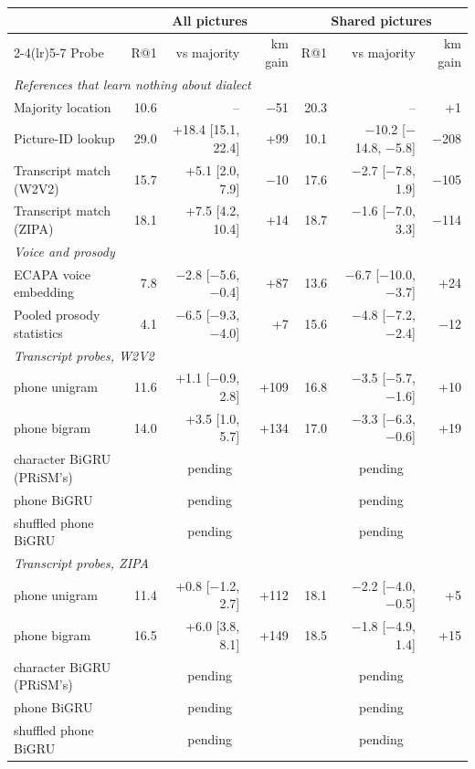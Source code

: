\begin{tabular}{lrrrrrr}
\toprule
 & \multicolumn{3}{c}{All pictures} & \multicolumn{3}{c}{Shared pictures} \\
\cmidrule(lr){2-4}\cmidrule(lr){5-7}
Probe & R@1 & vs majority & km gain & R@1 & vs majority & km gain \\
\midrule
\multicolumn{7}{l}{\textit{References that learn nothing about dialect}} \\
\quad Majority location & 10.6 & -- & $-$51 & 20.3 & -- & +1 \\
\quad Picture-ID lookup & 29.0 & +18.4 [15.1, 22.4] & +99 & 10.1 & $-$10.2 [$-$14.8, $-$5.8] & $-$208 \\
\quad Transcript match (W2V2) & 15.7 & +5.1 [2.0, 7.9] & $-$10 & 17.6 & $-$2.7 [$-$7.8, 1.9] & $-$105 \\
\quad Transcript match (ZIPA) & 18.1 & +7.5 [4.2, 10.4] & +14 & 18.7 & $-$1.6 [$-$7.0, 3.3] & $-$114 \\
\midrule
\multicolumn{7}{l}{\textit{Voice and prosody}} \\
\quad ECAPA voice embedding & 7.8 & $-$2.8 [$-$5.6, $-$0.4] & +87 & 13.6 & $-$6.7 [$-$10.0, $-$3.7] & +24 \\
\quad Pooled prosody statistics & 4.1 & $-$6.5 [$-$9.3, $-$4.0] & +7 & 15.6 & $-$4.8 [$-$7.2, $-$2.4] & $-$12 \\
\midrule
\multicolumn{7}{l}{\textit{Transcript probes, W2V2}} \\
\quad phone unigram & 11.6 & +1.1 [$-$0.9, 2.8] & +109 & 16.8 & $-$3.5 [$-$5.7, $-$1.6] & +10 \\
\quad phone bigram & 14.0 & +3.5 [1.0, 5.7] & +134 & 17.0 & $-$3.3 [$-$6.3, $-$0.6] & +19 \\
\quad character BiGRU (PRiSM's) & \multicolumn{3}{c}{pending} & \multicolumn{3}{c}{pending} \\
\quad phone BiGRU & \multicolumn{3}{c}{pending} & \multicolumn{3}{c}{pending} \\
\quad shuffled phone BiGRU & \multicolumn{3}{c}{pending} & \multicolumn{3}{c}{pending} \\
\midrule
\multicolumn{7}{l}{\textit{Transcript probes, ZIPA}} \\
\quad phone unigram & 11.4 & +0.8 [$-$1.2, 2.7] & +112 & 18.1 & $-$2.2 [$-$4.0, $-$0.5] & +5 \\
\quad phone bigram & 16.5 & +6.0 [3.8, 8.1] & +149 & 18.5 & $-$1.8 [$-$4.9, 1.4] & +15 \\
\quad character BiGRU (PRiSM's) & \multicolumn{3}{c}{pending} & \multicolumn{3}{c}{pending} \\
\quad phone BiGRU & \multicolumn{3}{c}{pending} & \multicolumn{3}{c}{pending} \\
\quad shuffled phone BiGRU & \multicolumn{3}{c}{pending} & \multicolumn{3}{c}{pending} \\
\bottomrule
\end{tabular}
